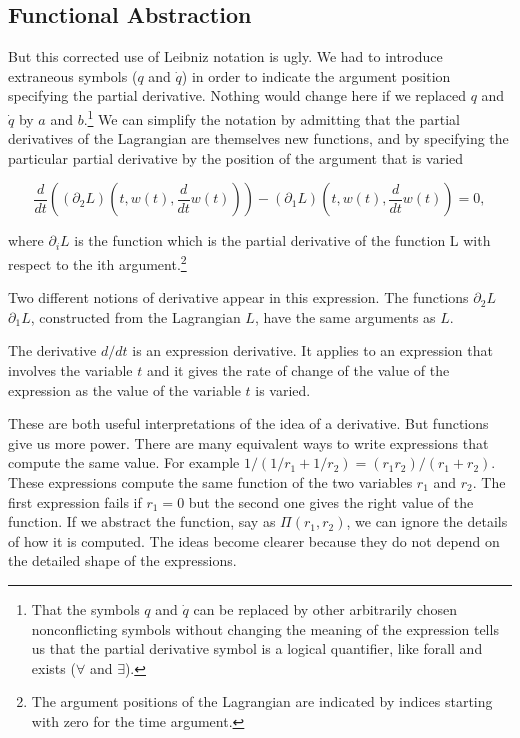 \documentclass[11pt]{article}
\begin{document}
\subsection{Functional Abstraction}
\label{sec:org3927372}

But this corrected use of Leibniz notation is ugly. We had to introduce
extraneous symbols (\(q\) and \(\dot{q}\)) in order to indicate the argument
position specifying the partial derivative. Nothing would change here if we
replaced \(q\) and \(\dot{q}\) by \(a\) and \(b\).\footnote{That the symbols \(q\) and \(\dot{q}\) can be replaced by other arbitrarily
chosen nonconflicting symbols without changing the meaning of the expression
tells us that the partial derivative symbol is a logical quantifier, like forall
and exists (\(\forall\) and \(\exists\)).} We can simplify the notation by
admitting that the partial derivatives of the Lagrangian are themselves new
functions, and by specifying the particular partial derivative by the position
of the argument that is varied

$$\frac{d}{d t}\left(\left(\partial_{2} L\right)\left(t, w(t), \frac{d}{d t}
w(t)\right)\right)-\left(\partial_{1} L\right)\left(t, w(t), \frac{d}{d t}
w(t)\right)=0,$$

where \(\partial_{i}L\) is the function which is the partial derivative of the
function L with respect to the ith argument.\footnote{The argument positions of the Lagrangian are indicated by indices
starting with zero for the time argument.}

Two different notions of derivative appear in this expression. The functions
\(\partial_2 L\) \(\partial_1 L\), constructed from the Lagrangian \(L\), have the
same arguments as \(L\).

The derivative \(d/dt\) is an expression derivative. It applies to an expression
that involves the variable \(t\) and it gives the rate of change of the value of
the expression as the value of the variable \(t\) is varied.

These are both useful interpretations of the idea of a derivative. But functions
give us more power. There are many equivalent ways to write expressions that
compute the same value. For example \(1/(1/r_1 + 1/r_2)=(r_1r_2)/(r_1 + r_2)\).
These expressions compute the same function of the two variables \(r_1\) and
\(r_2\). The first expression fails if \(r_1 = 0\) but the second one gives the
right value of the function. If we abstract the function, say as \(\Pi(r_1,
r_2)\), we can ignore the details of how it is computed. The ideas become clearer
because they do not depend on the detailed shape of the expressions.
\end{document}
